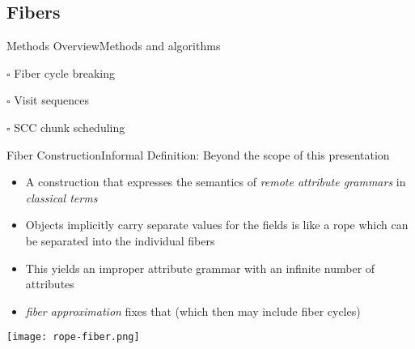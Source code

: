\subsection*{Fibers}{}

\begin{frame}{Methods Overview}{Methods and algorithms}
     \begin{description}
        \item $\square$ \alert{Fiber cycle breaking}
        \item $\square$  Visit sequences
        \item $\square$  SCC chunk scheduling
    \end{description}
\end{frame}


\begin{frame}{Fiber Construction}{Informal Definition: Beyond the scope of this presentation}

\small
\begin{itemize}
    \item A construction that expresses the semantics of \emph{remote attribute grammars} in \emph{classical terms}
    \item Objects \alert{implicitly} carry separate values for the fields is like a \alert{rope} which can be separated into the individual fibers
    \item This yields an improper attribute grammar with an infinite number of attributes
    \item \emph{fiber approximation} fixes that (which then may include \alert{fiber cycles})
\end{itemize}

\begin{center}
\texttt{[image: rope-fiber.png]}
\end{center}
    
\end{frame}



